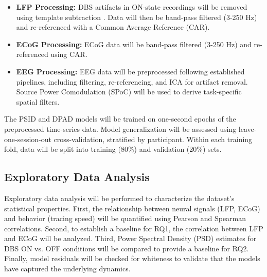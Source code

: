 \documentclass[12pt, a4paper]{article}
\begin{document}
\begin{itemize}
    \item \textbf{LFP Processing:} DBS artifacts in ON-state recordings will be removed using template subtraction \parencite{qianMethodRemovalDeep2017,hammerArtifactCharacterizationMultipurpose2022}. Data will then be band-pass filtered (3-250 Hz) and re-referenced with a Common Average Reference (CAR).

    \item \textbf{ECoG Processing:} ECoG data will be band-pass filtered (3-250 Hz) and re-referenced using CAR.

    \item \textbf{EEG Processing:} EEG data will be preprocessed following established pipelines, including filtering, re-referencing, and ICA for artifact removal. Source Power Comodulation (SPoC) will be used to derive task-specific spatial filters.
\end{itemize}

The PSID and DPAD models will be trained on one-second epochs of the preprocessed time-series data. Model generalization will be assessed using leave-one-session-out cross-validation, stratified by participant. Within each training fold, data will be split into training (80\%) and validation (20\%) sets.


\subsection{Exploratory Data Analysis}
Exploratory data analysis will be performed to characterize the dataset's statistical properties. First, the relationship between neural signals (LFP, ECoG) and behavior (tracing speed) will be quantified using Pearson and Spearman correlations. Second, to establish a baseline for RQ1, the correlation between LFP and ECoG will be analyzed. Third, Power Spectral Density (PSD) estimates for DBS ON vs. OFF conditions will be compared to provide a baseline for RQ2. Finally, model residuals will be checked for whiteness to validate that the models have captured the underlying dynamics.
\end{document}
